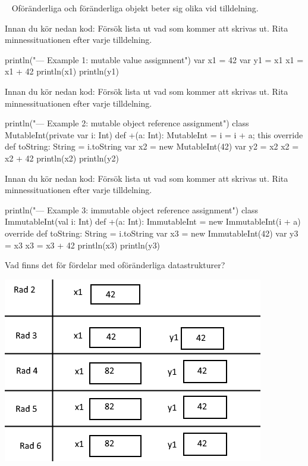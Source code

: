 \QUESTEND









\QUESTBEGIN

\Task  \what~  Oföränderliga och föränderliga objekt beter sig olika vid tilldelning.

\Subtask\Pen Innan du kör nedan kod: Försök lista ut vad som kommer att skrivas ut. Rita minnessituationen efter varje tilldelning.

\begin{Code}
println("\n--- Example 1: mutable value assigmnent")
var x1 = 42
var y1 = x1
x1 = x1 + 42
println(x1)
println(y1)
\end{Code}

\Subtask\Pen Innan du kör nedan kod: Försök lista ut vad som kommer att skrivas ut. Rita minnessituationen efter varje tilldelning.

\begin{Code}
println("\n--- Example 2: mutable object reference assignment")
class MutableInt(private var i: Int) {
  def +(a: Int): MutableInt = { i = i + a; this }
  override def toString: String = i.toString
}
var x2 = new MutableInt(42)
var y2 = x2
x2 = x2 + 42
println(x2)
println(y2)
\end{Code}

\Subtask\Pen Innan du kör nedan kod: Försök lista ut vad som kommer att skrivas ut. Rita minnessituationen efter varje tilldelning.

\begin{Code}
println("\n--- Example 3: immutable object reference assignment")
class ImmutableInt(val i: Int) {
  def +(a: Int): ImmutableInt = new ImmutableInt(i + a)
  override def toString: String = i.toString
}
var x3 = new ImmutableInt(42)
var y3 = x3
x3 = x3 + 42
println(x3)
println(y3)
\end{Code}

\Subtask\Pen Vad finns det för fördelar med oföränderliga datastrukturer?


\SOLUTION


\TaskSolved \what


\SubtaskSolved   \includegraphics[scale=0.5]{../img/w04-solutions/uppgift-13a}


